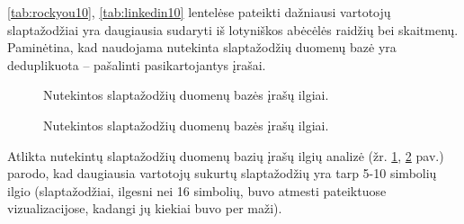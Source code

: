 \documentclass{VUMIFInfBakalaurinis}
\begin{document}
\ref{tab:rockyou10}, \ref{tab:linkedin10} lentelėse pateikti dažniausi vartotojų 
slaptažodžiai yra daugiausia sudaryti iš lotyniškos abėcėlės raidžių bei 
skaitmenų. Paminėtina, kad naudojama  nutekinta slaptažodžių 
duomenų bazė yra deduplikuota -- pašalinti pasikartojantys įrašai.

\begin{figure}[!ht]
  \begin{center}
  \end{center}
  \caption{%
    Nutekintos slaptažodžių duomenų bazės  įrašų ilgiai.
  }
  \label{plot:rockyoulength}
\end{figure}

\begin{figure}[!ht]
  \begin{center}
  \end{center}
  \caption{%
    Nutekintos slaptažodžių duomenų bazės  įrašų ilgiai.
  }
  \label{plot:linkedinlength}
\end{figure}

Atlikta nutekintų slaptažodžių duomenų bazių įrašų ilgių analizė (žr. 
\ref{plot:rockyoulength}, \ref{plot:linkedinlength} pav.) parodo, kad daugiausia 
vartotojų sukurtų slaptažodžių yra tarp 5-10 simbolių ilgio (slaptažodžiai, 
ilgesni nei 16 simbolių, buvo atmesti pateiktuose vizualizacijose, kadangi jų 
kiekiai buvo per maži).
\end{document}
